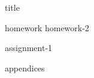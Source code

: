 \documentclass[11pt,titlepage]{report}
\begin{document}
{title}

\clearpage
\tableofcontents

\clearpage
{}
{homework}
{homework-2}

{assignment-1}

\clearpage
{}
\printbibliography[heading=bibintoc]

\clearpage
{}
{appendices}
\end{document}
